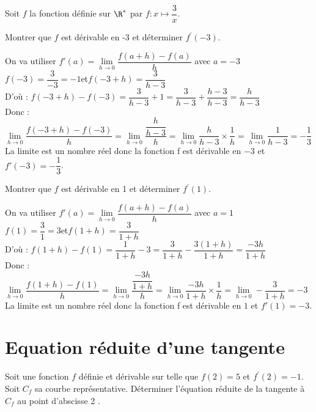 \documentclass[11pt,a4paper]{article}  %
\begin{document}
Soit $f$ la fonction définie sur $\R^*$ par $f: x \mapsto \dfrac{3}{x}$.
\begin{enumMet}
	\item Montrer que $f$  est dérivable en -3 et déterminer $f^{\prime}(-3)$.
	\begin{corrBox}
		On va utiliser $f'(a)=\lim \limits_{h \rightarrow 0} \dfrac{f(a+h)-f(a)}{h}$ avec $a=-3$\\
		$f(-3)=\dfrac{3}{-3}=-1$\quad\quad et\quad\quad  $f(-3+h)=\dfrac{3}{h-3}$\\
		D'où : $f(-3+h)-f(-3)=\dfrac{3}{h-3}+1=\dfrac{3}{h-3}+\dfrac{h-3}{h-3}=\dfrac{h}{h-3}$\\
		Donc : $\lim \limits_{h \rightarrow 0} \dfrac{f(-3+h)-f(-3)}{h}=\lim \limits_{h \rightarrow 0} \dfrac{\dfrac{h}{h-3}}{h}=\lim \limits_{h \rightarrow 0} \dfrac{h}{h-3}\times \dfrac{1}{h}=\lim \limits_{h \rightarrow 0} \dfrac{1}{h-3}=-\dfrac{1}{3}$\\
		La limite est un nombre réel donc la fonction f est dérivable en $-3$ et $f'(-3)=-\dfrac{1}{3}$.
	\end{corrBox}
	\item Montrer que $f$ est dérivable en 1 et déterminer $f^{\prime}(1)$.
	\begin{corrBox}
		On va utiliser $f'(a)=\lim \limits_{h \rightarrow 0} \dfrac{f(a+h)-f(a)}{h}$ avec $a=1$\\
		$f(1)=\dfrac{3}{1}=3$\quad\quad et\quad\quad  $f(1+h)=\dfrac{3}{1+h}$\\
		D'où : $f(1+h)-f(1)=\dfrac{1}{1+h}-3=\dfrac{3}{1+h}-\dfrac{3(1+h)}{1+h}=\dfrac{-3h}{1+h}$\\
		Donc : $\lim \limits_{h \rightarrow 0} \dfrac{f(1+h)-f(1)}{h}=\lim \limits_{h \rightarrow 0} \dfrac{\dfrac{-3h}{1+h}}{h}=\lim \limits_{h \rightarrow 0} \dfrac{-3h}{1+h}\times \dfrac{1}{h}=\lim \limits_{h \rightarrow 0} -\dfrac{3}{1+h}=-3$\\
		La limite est un nombre réel donc la fonction f est dérivable en $1$ et $f'(1)=-3$.
	\end{corrBox}
\end{enumMet}

\section*{Equation réduite d'une tangente}

\exercice{}

Soit une fonction $f$ définie et dérivable sur \R telle que $f(2)=5$ et $f^{\prime}(2)=-1$.
Soit $C_f$ sa courbe représentative. Déterminer l'équation réduite de la tangente à $C_f$ au point d'abscisse 2 .
\end{document}
